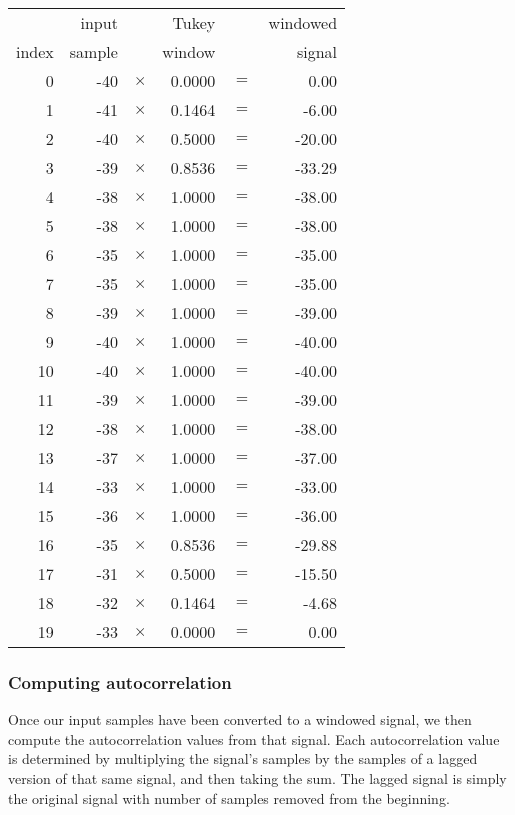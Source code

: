 {
\begin{tabular}{|r|r >{$}c<{$} r >{$}c<{$} r|}
\hline
& input & & Tukey & & windowed \\
index & sample & & window & & signal \\
\hline
0 & -40 & \times & 0.0000 & = & 0.00 \\
1 & -41 & \times & 0.1464 & = & -6.00 \\
2 & -40 & \times & 0.5000 & = & -20.00 \\
3 & -39 & \times & 0.8536 & = & -33.29 \\
4 & -38 & \times & 1.0000 & = & -38.00 \\
5 & -38 & \times & 1.0000 & = & -38.00 \\
6 & -35 & \times & 1.0000 & = & -35.00 \\
7 & -35 & \times & 1.0000 & = & -35.00 \\
8 & -39 & \times & 1.0000 & = & -39.00 \\
9 & -40 & \times & 1.0000 & = & -40.00 \\
10 & -40 & \times & 1.0000 & = & -40.00 \\
11 & -39 & \times & 1.0000 & = & -39.00 \\
12 & -38 & \times & 1.0000 & = & -38.00 \\
13 & -37 & \times & 1.0000 & = & -37.00 \\
14 & -33 & \times & 1.0000 & = & -33.00 \\
15 & -36 & \times & 1.0000 & = & -36.00 \\
16 & -35 & \times & 0.8536 & = & -29.88 \\
17 & -31 & \times & 0.5000 & = & -15.50 \\
18 & -32 & \times & 0.1464 & = & -4.68 \\
19 & -33 & \times & 0.0000 & = & 0.00 \\
\hline
\end{tabular}
}

\pagebreak

\subsubsection{Computing autocorrelation}

Once our input samples have been converted to a windowed signal,
we then compute the autocorrelation values from that signal.
Each autocorrelation value is determined by multiplying the signal's
samples by the samples of a lagged version of that same signal,
and then taking the sum.
The lagged signal is simply the original signal with  number of
samples removed from the beginning.

